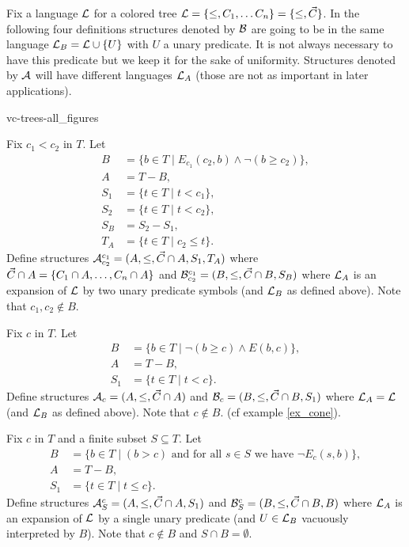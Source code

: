 Fix a language $\mathcal L$ for a colored tree $\mathcal L = \{\leq, C_1, \ldots C_n\} = \{\leq, \vec C\}$.
In the following four definitions structures denoted by $\mathcal B$ are going to be in the same language $\mathcal L_B = \mathcal L \cup \{U\}$ with $U$ a unary predicate.
It is not always necessary to have this predicate but we keep it for the sake of uniformity.
Structures denoted by $\mathcal A$ will have different languages $\mathcal L_A$ (those are not as important in later applications).

 {vc-trees-all_figures}

\begin{Definition}
  Fix $c_1 < c_2$ in $T$. Let
  \begin{align*}
    B &= \{b \in T \mid E_{c_1}(c_2, b) \wedge \neg(b \geq c_2)\}, \\
    A &= T - B, \\
    S_1 &= \{t \in T \mid t < c_1\}, \\
    S_2 &= \{t \in T \mid t < c_2\}, \\
    S_B &= S_2 - S_1, \\
    T_A &= \{t \in T \mid c_2 \leq t\}.
  \end{align*}
  Define structures $\mathcal A^{c_1}_{c_2} = (A, \leq, \vec C \cap A, S_1, T_A)$
  where $\vec C \cap A = \left\{C_1 \cap A, \ldots, C_n \cap A\right\}$
  and $\mathcal B^{c_1}_{c_2} = (B, \leq, \vec C \cap B, S_B)$ where $\mathcal L_A$ is an expansion of $\mathcal L$ by two unary predicate symbols (and $\mathcal L_B$ as defined above). Note that $c_1, c_2 \notin B$.
\end{Definition}


\begin{Definition}
  Fix $c$ in $T$. Let
  \begin{align*}
    B &= \{b \in T \mid \neg(b \geq c) \wedge E(b,c)\}, \\
    A &= T - B, \\
    S_1 &= \{t \in T \mid t < c\}.
  \end{align*}
  Define structures $\mathcal A_{c} = (A, \leq, \vec C \cap A)$ and $\mathcal B_{c} = (B, \leq, \vec C\cap B, S_1)$ where $\mathcal L_A = \mathcal L$ (and $\mathcal L_B$ as defined above). Note that $c \notin B$. (cf example \ref{ex_cone}).
\end{Definition}

\begin{Definition}
  Fix $c$ in $T$ and  a finite subset $S \subseteq T$. Let
  \begin{align*}
    B &= \{b \in T \mid (b > c) \text{ and for all $s \in S$ we have } \neg E_c(s, b)\}, \\
    A &= T - B, \\
    S_1 &= \{t \in T \mid t \leq c\}.
  \end{align*}
  Define structures $\mathcal A^{c}_{S} = (A, \leq, \vec C\cap A, S_1)$ and $\mathcal B^{c}_{S} = (B, \leq, \vec C\cap B, B)$ where $\mathcal L_A$ is an expansion of $\mathcal L$ by a single unary predicate (and $U \in \mathcal L_B$ vacuously interpreted by $B$). Note that $c \notin B$ and $S \cap B = \emptyset$.
\end{Definition}

